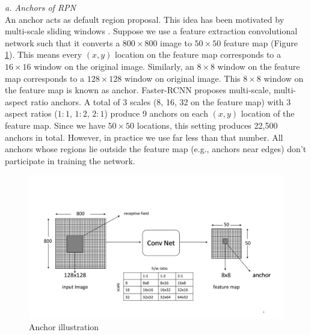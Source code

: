 \vspace{5pt}
\textit{a. Anchors of RPN}\\
An anchor acts as default region proposal. This idea has been motivated by multi-scale sliding windows \cite{ref_fasterrcnn}. Suppose we use a feature extraction convolutional network such that it converts a $800\times800$ image to $50\times50$ feature map (Figure \ref{fig:anchors}). This means every $(x,y)$ location on the feature map corresponds to a $16\times16$ window on the original image. Similarly, an $8\times8$ window on the feature map corresponds to a $128\times128$ window on original image. This $8\times8$ window on the feature map is known as anchor. Faster-RCNN proposes multi-scale, multi-aspect ratio anchors. A total of 3 scales (8, 16, 32 on the feature map) with 3 aspect ratios ($1:1$, $1:2$, $2:1$) produce 9 anchors on each $(x,y)$ location of the feature map. Since we have $50\times50$ locations, this setting produces 22,500 anchors in total. However, in practice we use far less than that number. All anchors whose regions lie outside the feature map (e.g., anchors near edges) don't participate in training the network. 

\begin{figure}
    \centering
    \includegraphics[width=\linewidth,trim={0 60 0 130},clip]{images/anchors}
    \caption[Anchor illustration]{Anchor illustration}
    \label{fig:anchors}
\end{figure}

